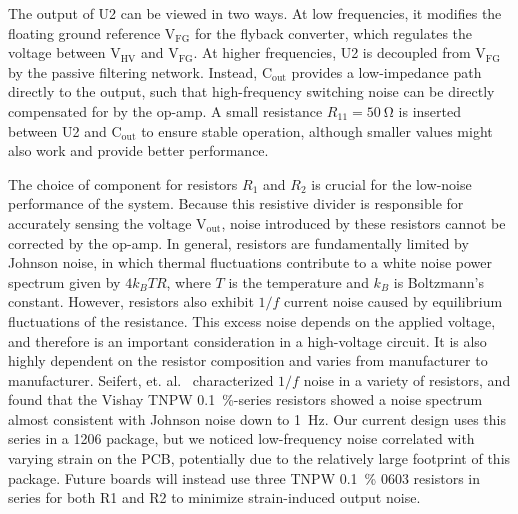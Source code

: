 \documentclass[aip,rsi,reprint]{revtex4-1} %
\begin{document}
The output of U2 can be viewed in two ways.
At low frequencies, it modifies the floating ground reference $\text{V}_\text{FG}$ for the flyback converter, which regulates the voltage between $\text{V}_\text{HV}$ and $\text{V}_\text{FG}$.
At higher frequencies, U2 is decoupled from $\text{V}_\text{FG}$ by the passive filtering network.
Instead, $\text{C}_\text{out}$ provides a low-impedance path directly to the output, such that high-frequency switching noise can be directly compensated for by the op-amp.
A small resistance $R_{11} = \SI{50}{\ohm}$ is inserted between U2 and $\text{C}_\text{out}$ to ensure stable operation, although smaller values might also work and provide better performance.
%
%
%

The choice of component for resistors $R_1$ and $R_2$ is crucial for the low-noise performance of the system. 
Because this resistive divider is responsible for accurately sensing the voltage $\text{V}_\text{out}$, noise introduced by these resistors cannot be corrected by the op-amp.
In general, resistors are fundamentally limited by Johnson noise, in which thermal fluctuations contribute to a white noise power spectrum given by $4 k_B T R$, where $T$ is the temperature and $k_B$ is Boltzmann's constant.\cite{Horowitz2015a:JN}
However, resistors also exhibit $1/f$ current noise caused by equilibrium fluctuations of the resistance.\cite{Clarke1974a,Voss1976a}
This excess noise depends on the applied voltage, and therefore is an important consideration in a high-voltage circuit.
It is also highly dependent on the resistor composition and varies from manufacturer to manufacturer.
Seifert, et. al.~\cite{Seifert2009a} characterized $1/f$ noise in a variety of resistors, and found that the Vishay TNPW \SI{0.1}{\percent}-series resistors showed a noise spectrum almost consistent with Johnson noise down to \SI{1}{\hertz}.
Our current design uses this series in a 1206 package, but we noticed low-frequency noise correlated with varying strain on the PCB, potentially due to the relatively large footprint of this package.
Future boards will instead use three TNPW \SI{0.1}{\percent} 0603 resistors in series for both R1 and R2 to minimize strain-induced output noise.
\end{document}
